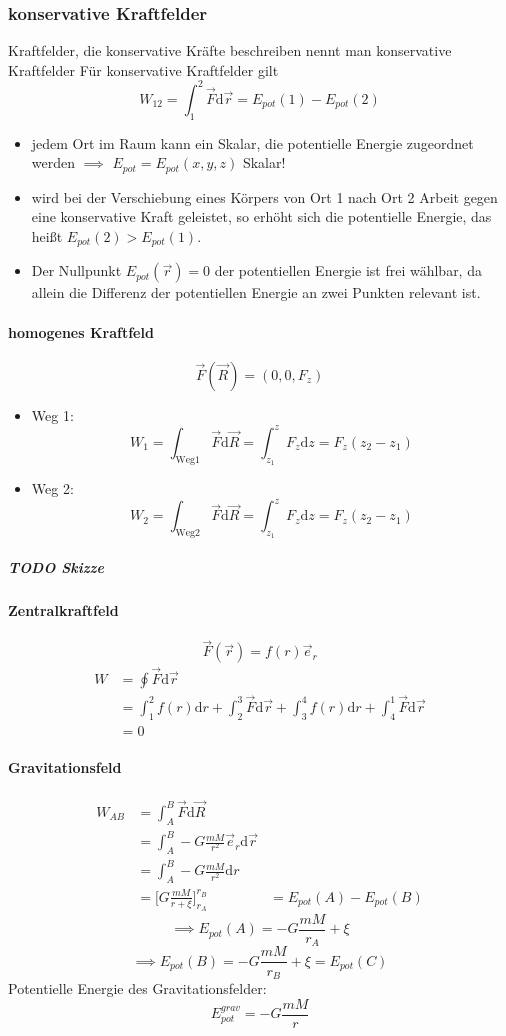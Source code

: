 \documentclass[a4paper]{scrartcl}
\renewcommand{\d}{\mathrm{d}}
\renewcommand{\v}[1]{\vec{#1}}
\theoremstyle{definition}
\theoremstyle{plain}
\theoremstyle{plain}
\theoremstyle{remark}
\theoremstyle{remark}
\theoremstyle{remark}
\begin{document}
\subsubsection{konservative Kraftfelder}
\label{sec-4-9-4}
Kraftfelder, die konservative Kräfte beschreiben nennt man konservative Kraftfelder
Für konservative Kraftfelder gilt
\[W_{12} = \int_1^2\v F\d\v r = E_{pot}(1) - E_{pot}(2)\]
\begin{itemize}
\item jedem Ort im Raum kann ein Skalar, die potentielle Energie zugeordnet werden $\implies$ $E_{pot} = E_{pot}(x,y,z)$ Skalar!
\item wird bei der Verschiebung eines Körpers von Ort 1 nach Ort 2 Arbeit gegen eine konservative Kraft geleistet, so erhöht sich die potentielle Energie, das heißt $E_{pot}(2) > E_{pot}(1)$.
\item Der Nullpunkt $E_{pot}(\v r) = 0$ der potentiellen Energie ist frei wählbar, da allein die Differenz der potentiellen Energie an zwei Punkten relevant ist.
\end{itemize}
\paragraph{homogenes Kraftfeld}
\label{sec-4-9-4-1}
\[\v F(\v R) = (0,0,F_z)\]
\begin{itemize}
\item Weg 1: \[W_1 = \int_{\text{Weg1}}\v F\d \v R = \int_{z_1}^z F_z\d z = F_z(z_2 - z_1)\]
\item Weg 2: \[W_2 = \int_{\text{Weg2}}\v F\d \v R = \int_{z_1}^z F_z\d z = F_z(z_2 - z_1)\]
\end{itemize}
\subparagraph{{\bfseries\sffamily TODO} Skizze}
\label{sec-4-9-4-1-1}
\paragraph{Zentralkraftfeld}
\label{sec-4-9-4-2}
\[\v F(\v r) = f(r)\v e_r\]
\begin{align}
W &= \oint\v F\d \v r \\
&= \int_1^2 f(r)\d r + \int_2^3 \v F\d \v r + \int_3^4 f(r)\d r + \int_4^1 \v F\d \v r \\
&= 0
\end{align}
\paragraph{Gravitationsfeld}
\label{sec-4-9-4-3}
\begin{align}
W_{AB} &= \int_A^B\v F\d \v R \\
&= \int_A^B -G\frac{mM}{r^2}\v e_r\d\v r \\
&= \int_A^B -G\frac{mM}{r^2}\d r \\
&= \Big[G\frac{mM}{r + \xi}\Big]_{r_A}^{r_B}
&= E_{pot}(A) - E_{pot}(B)
\end{align}
\[\implies E_{pot}(A) = -G\frac{mM}{r_A} + \xi\]
\[\implies E_{pot}(B) = -G\frac{mM}{r_B} + \xi = E_{pot}(C)\]
Potentielle Energie des Gravitationsfelder:
\[E_{pot}^{grav} = -G\frac{mM}{r}\]
\end{document}
